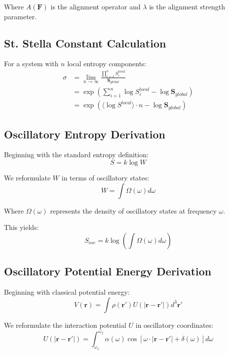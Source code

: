 \documentclass[12pt,a4paper]{article}
\begin{document}
Where $A(\mathbf{F})$ is the alignment operator and $\lambda$ is the alignment strength parameter.

\subsection{St. Stella Constant Calculation}

For a system with $n$ local entropy components:
\begin{align}
\sigma &= \lim_{n \to \infty} \frac{\prod_{i=1}^{n} S_i^{local}}{\mathbf{S}_{global}} \\
&= \exp\left(\sum_{i=1}^{n} \log S_i^{local} - \log \mathbf{S}_{global}\right) \\
&= \exp\left(\langle \log S^{local} \rangle \cdot n - \log \mathbf{S}_{global}\right)
\end{align}

\subsection{Oscillatory Entropy Derivation}

Beginning with the standard entropy definition:
\begin{equation}
S = k \log W
\end{equation}

We reformulate $W$ in terms of oscillatory states:
\begin{equation}
W = \int \Omega(\omega) d\omega
\end{equation}

Where $\Omega(\omega)$ represents the density of oscillatory states at frequency $\omega$.

This yields:
\begin{equation}
S_{osc} = k \log \left(\int \Omega(\omega) d\omega\right)
\end{equation}

\subsection{Oscillatory Potential Energy Derivation}

Beginning with classical potential energy:
\begin{equation}
V(\mathbf{r}) = \int \rho(\mathbf{r}') U(|\mathbf{r} - \mathbf{r}'|) d^3\mathbf{r}'
\end{equation}

We reformulate the interaction potential $U$ in oscillatory coordinates:
\begin{equation}
U(|\mathbf{r} - \mathbf{r}'|) = \int_{\omega_1}^{\omega_2} \alpha(\omega) \cos[\omega \cdot |\mathbf{r} - \mathbf{r}'| + \delta(\omega)] d\omega
\end{equation}
\end{document}
